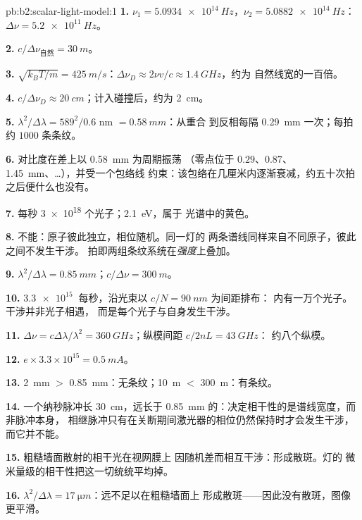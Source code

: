\begin{solution}{pb:b2:scalar-light-model:1}
\textbf{1.} $\nu_1 = \qty{5.0934e14}{Hz}$，$\nu_2 = \qty{5.0882e14}{Hz}$：$\Delta\nu = \qty{5.2e11}{Hz}$。

\textbf{2.} $c/\Delta\nu_{\text{自然}} = \qty{30}{m}$。

\textbf{3.} $\sqrt{k_BT/m} = \qty{425}{m/s}$：$\Delta\nu_D \approx 2\nu v/c \approx \qty{1.4}{GHz}$，约为
自然线宽的一百倍。

\textbf{4.} $c/\Delta\nu_D \approx \qty{20}{cm}$；计入碰撞后，约为 \qty{2}{cm}。

\textbf{5.} $\lambda^2/\Delta\lambda = 589^2/0.6$ nm $= \qty{0.58}{mm}$：从重合
到反相每隔 \qty{0.29}{mm} 一次；每拍约 $1000$ 条条纹。

\textbf{6.} 对比度在差上以 \qty{0.58}{mm} 为周期振荡
（零点位于 $0.29$、$0.87$、\qty{1.45}{mm}、\dots），并受一个包络线
约束：该包络在几厘米内逐渐衰减，约五十次拍之后便什么也没有。

\textbf{7.} 每秒 \qty{3e18}{} 个光子；\qty{2.1}{eV}，属于
光谱中的黄色。

\textbf{8.} 不能：原子彼此独立，相位随机。同一灯的
两条谱线同样来自不同原子，彼此之间不发生干涉。
拍即两组条纹系统在\emph{强度}上叠加。

\textbf{9.} $\lambda^2/\Delta\lambda = \qty{0.85}{mm}$；$c/\Delta\nu = \qty{300}{m}$。

\textbf{10.} $\qty{3.3e15}{}$ 每秒，沿光束以 $c/N = \qty{90}{nm}$ 为间距排布：
内有一万个光子。干涉并非光子相遇，
而是每个光子与自身发生干涉。

\textbf{11.} $\Delta\nu = c\Delta\lambda/\lambda^2 = \qty{360}{GHz}$；纵模间距 $c/2nL = \qty{43}{GHz}$：
约八个纵模。

\textbf{12.} $e \times 3.3 \times 10^{15} = \qty{0.5}{mA}$。

\textbf{13.} \qty{2}{mm} $>$ \qty{0.85}{mm}：无条纹；\qty{10}{m} $<$ \qty{300}{m}：有条纹。

\textbf{14.} 一个纳秒脉冲长 \qty{30}{cm}，远长于
\qty{0.85}{mm} 的：决定相干性的是谱线宽度，而非脉冲本身，
相继脉冲只有在关断期间激光器的相位仍然保持时才会发生干涉，
而它并不能。

\textbf{15.} 粗糙墙面散射的相干光在视网膜上
因随机差而相互干涉：形成散斑。灯的
微米量级的相干性把这一切统统平均掉。

\textbf{16.} $\lambda^2/\Delta\lambda = \qty{17}{\micro m}$：远不足以在粗糙墙面上
形成散斑——因此没有散斑，图像更平滑。


\end{solution}
